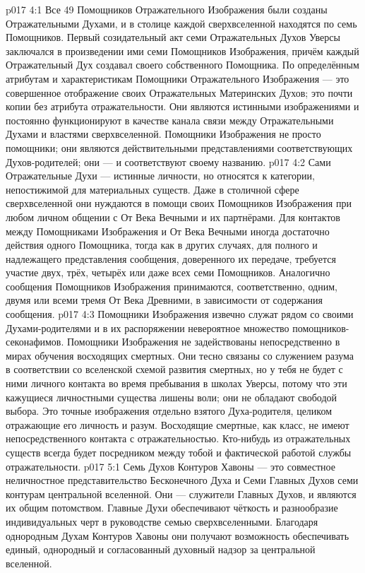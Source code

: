 \vs p017 4:1 Все 49 Помощников Отражательного Изображения были созданы Отражательными Духами, и в столице каждой сверхвселенной находятся по семь Помощников. Первый созидательный акт семи Отражательных Духов Уверсы заключался в произведении ими семи Помощников Изображения, причём каждый Отражательный Дух создавал своего собственного Помощника. По определённым атрибутам и характеристикам Помощники Отражательного Изображения --- это совершенное отображение своих Отражательных Материнских Духов; это почти копии без атрибута отражательности. Они являются истинными изображениями и постоянно функционируют в качестве канала связи между Отражательными Духами и властями сверхвселенной. Помощники Изображения не просто помощники; они являются действительными представлениями соответствующих Духов\hyp{}родителей; они ---  и соответствуют своему названию.
\vs p017 4:2 Сами Отражательные Духи --- истинные личности, но относятся к категории, непостижимой для материальных существ. Даже в столичной сфере сверхвселенной они нуждаются в помощи своих Помощников Изображения при любом личном общении с От Века Вечными и их партнёрами. Для контактов между Помощниками Изображения и От Века Вечными иногда достаточно действия одного Помощника, тогда как в других случаях, для полного и надлежащего представления сообщения, доверенного их передаче, требуется участие двух, трёх, четырёх или даже всех семи Помощников. Аналогично сообщения Помощников Изображения принимаются, соответственно, одним, двумя или всеми тремя От Века Древними, в зависимости от содержания сообщения.
\vs p017 4:3 Помощники Изображения извечно служат рядом со своими Духами\hyp{}родителями и в их распоряжении невероятное множество помощников\hyp{}секонафимов. Помощники Изображения не задействованы непосредственно в мирах обучения восходящих смертных. Они тесно связаны со служением разума в соответствии со вселенской схемой развития смертных, но у тебя не будет с ними личного контакта во время пребывания в школах Уверсы, потому что эти кажущиеся личностными существа лишены воли; они не обладают свободой выбора. Это точные изображения отдельно взятого Духа\hyp{}родителя, целиком отражающие его личность и разум. Восходящие смертные, как класс, не имеют непосредственного контакта с отражательностью. Кто\hyp{}нибудь из отражательных существ всегда будет посредником между тобой и фактической работой службы отражательности.
\vs p017 5:1 Семь Духов Контуров Хавоны --- это совместное неличностное представительство Бесконечного Духа и Семи Главных Духов семи контурам центральной вселенной. Они --- служители Главных Духов, и являются их общим потомством. Главные Духи обеспечивают чёткость и разнообразие индивидуальных черт в руководстве семью сверхвселенными. Благодаря однородным Духам Контуров Хавоны они получают возможность обеспечивать единый, однородный и согласованный духовный надзор за центральной вселенной.
